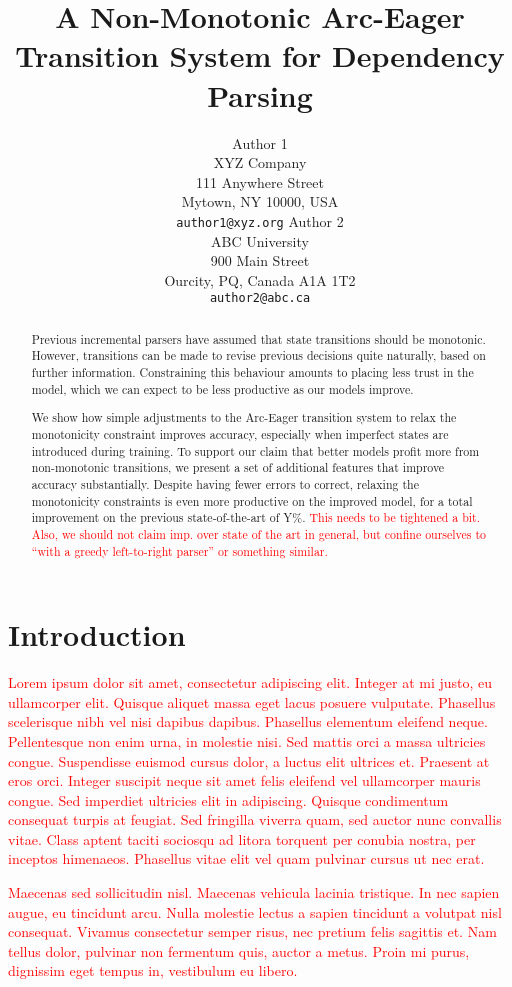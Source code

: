 \documentclass[11pt,letterpaper]{article}
\title{A Non-Monotonic Arc-Eager Transition System for Dependency Parsing}
\author{Author 1\\
	    XYZ Company\\
	    111 Anywhere Street\\
	    Mytown, NY 10000, USA\\
	    {\tt author1@xyz.org}
	  \And
	Author 2\\
  	ABC University\\
  	900 Main Street\\
  	Ourcity, PQ, Canada A1A 1T2\\
  {\tt author2@abc.ca}}
\date{}
\newcommand{\note}[1]{\textcolor{red}{#1}}
\begin{document}
\maketitle
\begin{abstract}
    Previous incremental parsers have assumed that state transitions
    should be monotonic. However, transitions can be made to revise
    previous decisions quite naturally, based on further information.
    Constraining this behaviour amounts
    to placing less trust in the model, which we can expect to be less productive as
    our models improve.

    We show how simple adjustments to the Arc-Eager transition system to relax the
    monotonicity constraint improves accuracy, especially when imperfect
    states are introduced during training. To support our claim that better models
    profit more from non-monotonic transitions, we present a set of
    additional features that improve accuracy substantially. Despite having fewer errors
    to correct, relaxing the monotonicity constraints is even more productive on
    the improved model, for a total improvement on the previous state-of-the-art of
    Y\%.
    \note{This needs to be tightened a bit. Also, we should not claim imp.
    over state of the art in general, but confine ourselves to ``with a greedy
    left-to-right parser'' or something similar.}
\end{abstract}

\section{Introduction}
\note{Lorem ipsum dolor sit amet, consectetur adipiscing elit. Integer at mi justo, eu ullamcorper elit. Quisque aliquet massa eget lacus posuere vulputate. Phasellus scelerisque nibh vel nisi dapibus dapibus. Phasellus elementum eleifend neque. Pellentesque non enim urna, in molestie nisi. Sed mattis orci a massa ultricies congue. Suspendisse euismod cursus dolor, a luctus elit ultrices et. Praesent at eros orci. Integer suscipit neque sit amet felis eleifend vel ullamcorper mauris congue. Sed imperdiet ultricies elit in adipiscing. Quisque condimentum consequat turpis at feugiat. Sed fringilla viverra quam, sed auctor nunc convallis vitae. Class aptent taciti sociosqu ad litora torquent per conubia nostra, per inceptos himenaeos. Phasellus vitae elit vel quam pulvinar cursus ut nec erat.}

\note{Maecenas sed sollicitudin nisl. Maecenas vehicula lacinia tristique. In nec sapien augue, eu tincidunt arcu. Nulla molestie lectus a sapien tincidunt a volutpat nisl consequat. Vivamus consectetur semper risus, nec pretium felis sagittis et. Nam tellus dolor, pulvinar non fermentum quis, auctor a metus. Proin mi purus, dignissim eget tempus in, vestibulum eu libero.}
\end{document}
